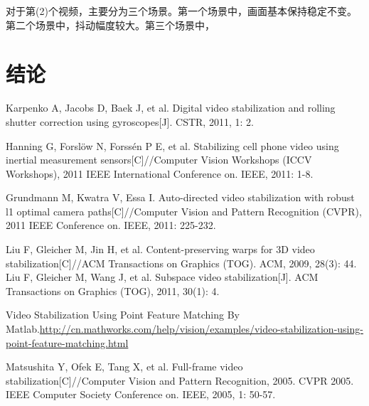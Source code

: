 \documentclass[journal, a4paper]{IEEEtran}
\begin{document}
    对于第(2)个视频，主要分为三个场景。第一个场景中，画面基本保持稳定不变。第二个场景中，抖动幅度较大。第三个场景中，
    
\section{结论}


\begin{thebibliography}{5}

Karpenko A, Jacobs D, Baek J, et al. Digital video stabilization and rolling shutter correction using gyroscopes[J]. CSTR, 2011, 1: 2.

    Hanning G, Forslöw N, Forssén P E, et al. Stabilizing cell phone video using inertial measurement sensors[C]//Computer Vision Workshops (ICCV Workshops), 2011 IEEE International Conference on. IEEE, 2011: 1-8.
    
    Grundmann M, Kwatra V, Essa I. Auto-directed video stabilization with robust l1 optimal camera paths[C]//Computer Vision and Pattern Recognition (CVPR), 2011 IEEE Conference on. IEEE, 2011: 225-232.
    
    Liu F, Gleicher M, Jin H, et al. Content-preserving warps for 3D video stabilization[C]//ACM Transactions on Graphics (TOG). ACM, 2009, 28(3): 44.
    Liu F, Gleicher M, Wang J, et al. Subspace video stabilization[J]. ACM Transactions on Graphics (TOG), 2011, 30(1): 4.
    
    Video Stabilization Using Point Feature Matching By Matlab.\url{http://cn.mathworks.com/help/vision/examples/video-stabilization-using-point-feature-matching.html}
    
    Matsushita Y, Ofek E, Tang X, et al. Full-frame video stabilization[C]//Computer Vision and Pattern Recognition, 2005. CVPR 2005. IEEE Computer Society Conference on. IEEE, 2005, 1: 50-57.
    

\end{thebibliography}

\end{document}
